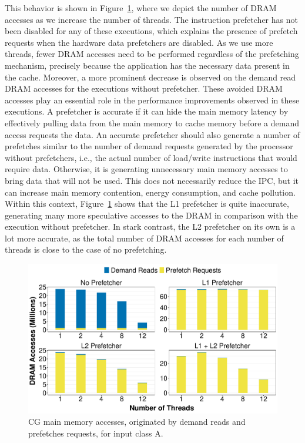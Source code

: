 \documentclass[AMA,final,STIX1COL]{WileyNJD-v2}
\begin{document}
This behavior is shown in Figure~\ref{fig:drampapi}, where we depict the number of DRAM accesses as we increase the number of threads.
The instruction prefetcher has not been disabled for any of these executions, which explains the presence of prefetch requests when the hardware data prefetchers are disabled.
As we use more threads, fewer DRAM accesses need to be performed regardless of the prefetching mechanism, precisely because the application has the necessary data present in the cache.
Moreover, a more prominent decrease is observed on the demand read DRAM accesses for the executions without prefetcher.
These avoided DRAM accesses play an essential role in the performance improvements observed in these executions.
A prefetcher is accurate if it can hide the main memory latency by effectively pulling data from the main memory to cache memory before a demand access requests the data.
An accurate prefetcher should also generate a number of prefetches similar to the number of demand requests generated by the processor without prefetchers, i.e., the actual number of load/write instructions that would require data.
Otherwise, it is generating unnecessary main memory accesses to bring data that will not be used.
This does not necessarily reduce the IPC, but it can increase main memory contention, energy consumption, and cache pollution.
Within this context, Figure~\ref{fig:drampapi} shows that the L1 prefetcher is quite inaccurate, generating many more speculative accesses to the DRAM in comparison with the execution without prefetcher. 
In stark contrast, the L2 prefetcher on its own is a lot more accurate, as the total number of DRAM accesses for each number of threads is close to the case of no prefetching. 

\begin{figure}[!htb]
    \centering
    \includegraphics[width=.8\linewidth]{figures/dram-accesses-real.pdf}
    \caption{CG main memory accesses, originated by demand reads and prefetches requests, for input class A.}
    \label{fig:drampapi}
\end{figure}
\end{document}
